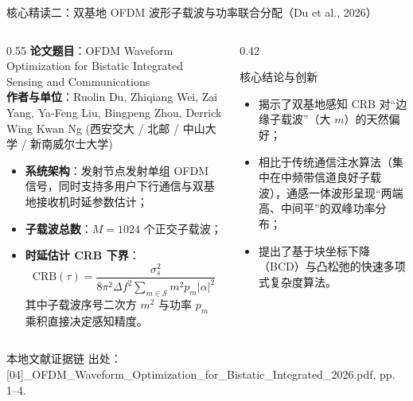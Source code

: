 \documentclass[aspectratio=169, 10pt]{ctexbeamer}
\begin{document}
\begin{frame}{核心精读二：双基地 OFDM 波形子载波与功率联合分配（Du et al., 2026）}
  \begin{columns}
    \begin{column}{0.55\textwidth}
      \textbf{论文题目}：OFDM Waveform Optimization for Bistatic Integrated Sensing and Communications\\
      \textbf{作者与单位}：Ruolin Du, Zhiqiang Wei, Zai Yang, Ya-Feng Liu, Bingpeng Zhou, Derrick Wing Kwan Ng (西安交大 / 北邮 / 中山大学 / 新南威尔士大学)
      \begin{itemize}
        \item \textbf{系统架构}：发射节点发射单组 OFDM 信号，同时支持多用户下行通信与双基地接收机时延参数估计；
        \item \textbf{子载波总数}：$M = 1024$ 个正交子载波；
        \item \textbf{时延估计 CRB 下界}：
        \begin{equation*}
          \mathrm{CRB}(\tau) = \frac{\sigma_s^2}{8\pi^2 \Delta f^2 \sum_{m \in \mathcal{S}} m^2 p_m |\alpha|^2}
        \end{equation*}
        其中子载波序号二次方 $m^2$ 与功率 $p_m$ 乘积直接决定感知精度。
      \end{itemize}
    \end{column}
    \begin{column}{0.42\textwidth}
      \begin{block}{核心结论与创新}
        \begin{itemize}
          \item 揭示了双基地感知 CRB 对“边缘子载波”（大 $m$）的天然偏好；
          \item 相比于传统通信注水算法（集中在中频带信道良好子载波），通感一体波形呈现“两端高、中间平”的双峰功率分布；
          \item 提出了基于块坐标下降（BCD）与凸松弛的快速多项式复杂度算法。
        \end{itemize}
      \end{block}
    \end{column}
  \end{columns}

  \begin{block}{本地文献证据链}
    \footnotesize \textcolor{evidencegray}{出处：[04]\_OFDM\_Waveform\_Optimization\_for\_Bistatic\_Integrated\_2026.pdf, pp. 1--4.}
  \end{block}
\end{frame}
\end{document}
